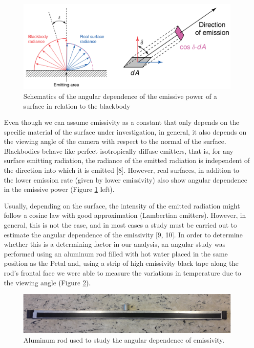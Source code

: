 		\begin{figure}[ht!]
			\centering
			\captionsetup{justification=centering,margin=2cm}
			\includegraphics[scale=0.22]{Figures/Chapter03/AngularDistributionSchematics.pdf}
			\caption{Schematics of the angular dependence of the emissive power of a surface in relation to the blackbody}\label{fig3.2}
		\end{figure}
				
		Even though we can assume emissivity as a constant that only depends on the specific material of the surface under investigation, in general, it also depends on the viewing angle of the camera with respect to the normal of the surface. Blackbodies behave like perfect isotropically diffuse emitters, that is, for any surface emitting radiation, the radiance of the emitted radiation is independent of the direction into which it is emitted [8]. However, real surfaces, in addition to the lower emission rate (given by lower emissivity) also show angular dependence in the emissive power (Figure \ref{fig3.2} left).
		
		Usually, depending on the surface, the intensity of the emitted radiation might follow a cosine law with good approximation (Lambertian emitters). However, in general, this is not the case, and in most cases a study must be carried out to estimate the angular dependence of the emissivity [9, 10]. In order to determine whether this is a determining factor in our analysis, an angular study was performed using an aluminum rod filled with hot water placed in the same position as the Petal and, using a strip of high emissivity black tape along the rod's frontal face we were able to measure the variations in temperature due to the viewing angle (Figure \ref{fig3.3}).
				
		\begin{figure}[ht!]
			\centering
			\captionsetup{justification=centering,margin=2cm}
			\includegraphics[scale=0.3]{Figures/Chapter03/AluminumRod.pdf}
			\caption{Aluminum rod used to study the angular dependence of emissivity.}\label{fig3.3}
		\end{figure}
		
